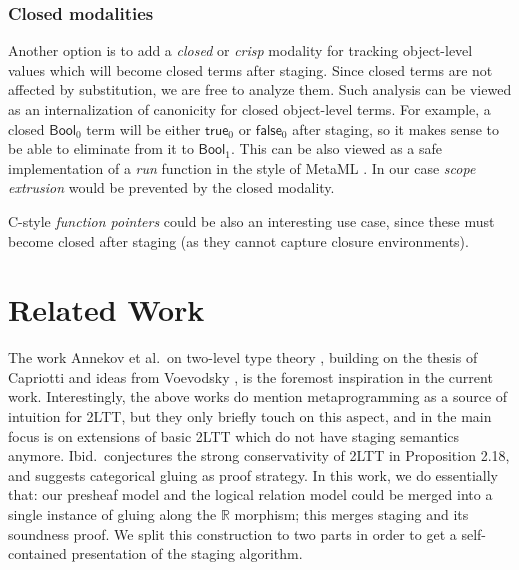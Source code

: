 \documentclass[acmsmall]{acmart}
\newcommand{\msf}[1]{\mathsf{#1}}
\newcommand{\mbb}[1]{\mathbb{#1}}
\newcommand{\Bool}{\msf{Bool}}
\newcommand{\true}{\msf{true}}
\newcommand{\false}{\msf{false}}
\newcommand{\re}{\mbb{R}}
\theoremstyle{remark}
\begin{document}
\subsubsection{Closed modalities}\label{sec:closed-modalities}
Another option is to add a \emph{closed} or \emph{crisp} modality
\cite{licata2018internal} for tracking object-level values which will become
closed terms after staging. Since closed terms are not affected by substitution,
we are free to analyze them. Such analysis can be viewed as an internalization
of canonicity for closed object-level terms. For example, a closed $\Bool_0$
term will be either $\true_0$ or $\false_0$ after staging, so it makes sense to
be able to eliminate from it to $\Bool_1$. This can be also viewed as a safe
implementation of a \emph{run} function in the style of MetaML \cite{metaml}.
In our case \emph{scope extrusion} would be prevented by the closed modality.

C-style \emph{function pointers} could be also an interesting use case, since
these must become closed after staging (as they cannot capture closure
environments).

\section{Related Work}\label{sec:related-work}

The work Annekov et al.\ on two-level type theory \cite{twolevel}, building on
the thesis of Capriotti \cite{capriotti2017models} and ideas from Voevodsky
\cite{hts}, is the foremost inspiration in the current work. Interestingly, the
above works do mention metaprogramming as a source of intuition for 2LTT, but
they only briefly touch on this aspect, and in \cite{twolevel} the main focus is
on extensions of basic 2LTT which do not have staging semantics
anymore. Ibid.\ conjectures the strong conservativity of 2LTT in Proposition
2.18, and suggests categorical gluing as proof strategy. In this work, we do
essentially that: our presheaf model and the logical relation model could be
merged into a single instance of gluing along the $\re$ morphism; this merges
staging and its soundness proof. We split this construction to two parts in order
to get a self-contained presentation of the staging algorithm.
\end{document}
